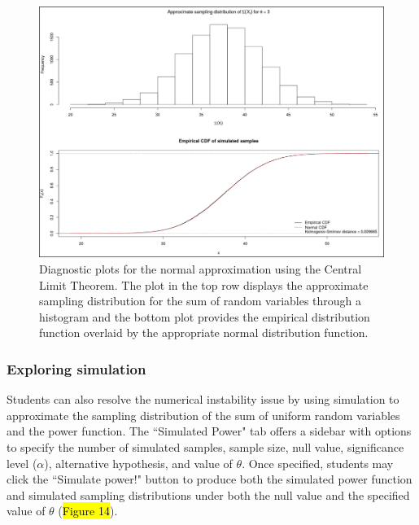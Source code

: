 \documentclass{TISE}
\begin{document}
\begin{figure}[H]
	\centering
	\includegraphics[width=\textwidth]{normapprox2.png}
	\caption{Diagnostic plots for the normal approximation using the Central Limit Theorem. The plot in the top row displays the approximate sampling distribution for the sum of random variables through a histogram and the bottom plot provides the empirical distribution function overlaid by the appropriate normal distribution function.}
\end{figure}

\subsubsection{Exploring simulation}

Students can also resolve the numerical instability issue by using simulation to approximate the sampling distribution of the sum of uniform random variables and the power function. The ``Simulated Power" tab offers a sidebar with options to specify the number of simulated samples, sample size, null value, significance level ($\alpha$), alternative hypothesis, and value of $\theta$. Once specified, students may click the ``Simulate power!" button to produce both the simulated power function and simulated sampling distributions under both the null value and the specified value of $\theta$ (\hl{Figure 14}).
\end{document}
